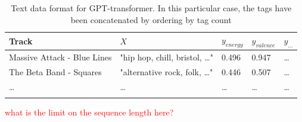 \documentclass[sn-mathphys]{sn-jnl}%
\theoremstyle{thmstyleone}%
\theoremstyle{thmstyletwo}%
\theoremstyle{thmstylethree}%
\begin{document}
\begin{table}[h]
      \begin{center}
      \begin{minipage}{\textwidth}
      \caption{Text data format for GPT-transformer. In this particular case, the tags have been concatenated by ordering by tag count}\label{text_format}%
      \begin{tabular}{@{}lllll@{}}
      \toprule
      Track                         & $X$                                   & $y_{energy}$ & $y_{valence}$ & $y_{\dots}$ \\
      \midrule
      Massive Attack - Blue Lines   & "hip hop, chill, bristol, \dots"      & 0.496        & 0.947         & \dots  \\
      The Beta Band - Squares       & "alternative rock, folk, \dots"       & 0.446        & 0.507         & \dots \\
      \dots                         & \dots                                 & \dots        & \dots         & \dots  \\
      \botrule
      \end{tabular}
      \end{minipage}
      \end{center}
\end{table}


\textcolor{red}{what is the limit on the sequence length here?}








\end{document}

